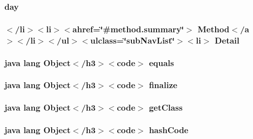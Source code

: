 \hypertarget{_tools_8html_ae8bf5a756cf15252b4e514a258bbbde9}{
\subsubsection[{day}]{\setlength{\rightskip}{0pt plus 5cm}day}}\label{_tools_8html_ae8bf5a756cf15252b4e514a258bbbde9}
\hypertarget{_tools_8html_a1e04b5ec07bcd5281e26dcd40e5b3a94}{
\subsubsection[{Detail}]{\setlength{\rightskip}{0pt plus 5cm}$<$/li$>$$<$li$>$$<$ahref=\char`\"{}\#method.\-summary\char`\"{}$>$ Method$<$/{\bf a}$>$$<$/li$>$$<$/ul$>$$<$ulclass=\char`\"{}sub\-Nav\-List\char`\"{}$>$$<$li$>$ Detail}}\label{_tools_8html_a1e04b5ec07bcd5281e26dcd40e5b3a94}
\hypertarget{_tools_8html_a8974318cea585f72df717e0380ec7104}{
\subsubsection[{equals}]{\setlength{\rightskip}{0pt plus 5cm}java lang Object$<$/h3$>$$<$code$>$ equals}}\label{_tools_8html_a8974318cea585f72df717e0380ec7104}
\hypertarget{_tools_8html_ab2315181ead4aeedef2374039b6ddde7}{
\subsubsection[{finalize}]{\setlength{\rightskip}{0pt plus 5cm}java lang Object$<$/h3$>$$<$code$>$ finalize}}\label{_tools_8html_ab2315181ead4aeedef2374039b6ddde7}
\hypertarget{_tools_8html_a98e6644727fe65eac217a6855045be43}{
\subsubsection[{get\-Class}]{\setlength{\rightskip}{0pt plus 5cm}java lang Object$<$/h3$>$$<$code$>$ get\-Class}}\label{_tools_8html_a98e6644727fe65eac217a6855045be43}
\hypertarget{_tools_8html_a8e178e2bb2bef055ea23ea3910a221ca}{
\subsubsection[{hash\-Code}]{\setlength{\rightskip}{0pt plus 5cm}java lang Object$<$/h3$>$$<$code$>$ hash\-Code}}\label{_tools_8html_a8e178e2bb2bef055ea23ea3910a221ca}

